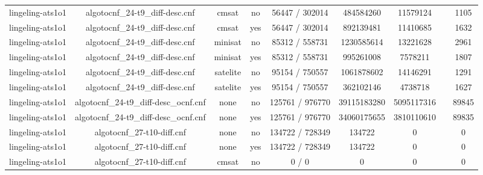 \begin{appendices}
\begin{table}[p]
\begin{center}
\begin{tabular}{l|cccccccc}
  lingeling-ats1o1               & algotocnf\_24-t9\_diff-desc.cnf & cmsat      & no    & 56447 / 302014 & 484584260 & 11579124  &            & 1105 \\ %
  lingeling-ats1o1               & algotocnf\_24-t9\_diff-desc.cnf & cmsat      & yes   & 56447 / 302014 & 892139481 & 11410685  &            & 1632 \\ %
  lingeling-ats1o1               & algotocnf\_24-t9\_diff-desc.cnf & minisat    & no    & 85312 / 558731 & 1230585614 & 13221628  &            & 2961 \\ %
  lingeling-ats1o1               & algotocnf\_24-t9\_diff-desc.cnf & minisat    & yes   & 85312 / 558731 & 995261008 & 7578211   &            & 1807 \\ %
  lingeling-ats1o1               & algotocnf\_24-t9\_diff-desc.cnf & satelite   & no    & 95154 / 750557 & 1061878602 & 14146291  &            & 1291 \\ %
  lingeling-ats1o1               & algotocnf\_24-t9\_diff-desc.cnf & satelite   & yes   & 95154 / 750557 & 362102146 & 4738718   &            & 1627 \\ %
  lingeling-ats1o1               & algotocnf\_24-t9\_diff-desc\_ocnf.cnf & none       & no    & 125761 / 976770 & 39115183280 & 5095117316 &            & 89845 \\ %
  lingeling-ats1o1               & algotocnf\_24-t9\_diff-desc\_ocnf.cnf & none       & yes   & 125761 / 976770 & 34060175655 & 3810110610 &            & 89835 \\ %
  lingeling-ats1o1               & algotocnf\_27-t10-diff.cnf     & none       & no    & 134722 / 728349 & 134722    & 0         &            & 0 \\ %
  lingeling-ats1o1               & algotocnf\_27-t10-diff.cnf     & none       & yes   & 134722 / 728349 & 134722    & 0         &            & 0 \\ %
  lingeling-ats1o1               & algotocnf\_27-t10-diff.cnf     & cmsat      & no    & 0 / 0      & 0         & 0         &            & 0 \\ %

\end{tabular}
\end{center}
\end{table}
\end{appendices}
